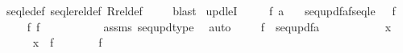 \begin{isabellebody}
\ seqle{\isacharunderscore}{\kern0pt}def\ seqlerel{\isacharunderscore}{\kern0pt}def\ Rrel{\isacharunderscore}{\kern0pt}def\ \isanewline
\ \ \isamarkupfalse%
\ blast%
\endisatagproof
{\isafoldproof}%
%
\isadelimproof
\isanewline
%
\endisadelimproof
\isanewline
{}\isamarkupfalse%
\ upd{\isacharunderscore}{\kern0pt}leI\ {\isacharcolon}{\kern0pt}\ \isanewline
\ \ \ {\isachardoublequoteopen}f{\isasymin}{}{\isacharcircum}{\kern0pt}{\isacharless}{\kern0pt}{\isasymomega}{\isachardoublequoteclose}\ {\isachardoublequoteopen}a{\isasymin}{}{\isachardoublequoteclose}\isanewline
\ \ \ {\isachardoublequoteopen}{\isasymlangle}seq{\isacharunderscore}{\kern0pt}upd{\isacharparenleft}{\kern0pt}f{\isacharcomma}{\kern0pt}a{\isacharparenright}{\kern0pt}{\isacharcomma}{\kern0pt}f{\isasymrangle}{\isasymin}seqle{\isachardoublequoteclose}\ \ {\isacharparenleft}{\kern0pt}\ {\isachardoublequoteopen}{\isasymlangle}{\isacharquery}{\kern0pt}f{\isacharcomma}{\kern0pt}{\isacharunderscore}{\kern0pt}{\isasymrangle}{\isasymin}{\isacharunderscore}{\kern0pt}{\isachardoublequoteclose}{\isacharparenright}{\kern0pt}\isanewline
%
\isadelimproof
%
\endisadelimproof
%
\isatagproof
{}\isamarkupfalse%
\isanewline
\ \ \isamarkupfalse%
\ {\isachardoublequoteopen}\ {\isasymlangle}{\isacharquery}{\kern0pt}f{\isacharcomma}{\kern0pt}\ f{\isasymrangle}\ {\isasymin}\ {}{\isacharcircum}{\kern0pt}{\isacharless}{\kern0pt}{\isasymomega}\ {\isasymtimes}\ {}{\isacharcircum}{\kern0pt}{\isacharless}{\kern0pt}{\isasymomega}{\isachardoublequoteclose}\ \isanewline
\ \ \ \ \isamarkupfalse%
\ assms\ seq{\isacharunderscore}{\kern0pt}upd{\isacharunderscore}{\kern0pt}type\ \isamarkupfalse%
\ auto\isanewline
{}\isamarkupfalse%
\isanewline
\ \ \isamarkupfalse%
\ \ {\isachardoublequoteopen}f\ {\isasymsubseteq}\ seq{\isacharunderscore}{\kern0pt}upd{\isacharparenleft}{\kern0pt}f{\isacharcomma}{\kern0pt}a{\isacharparenright}{\kern0pt}{\isachardoublequoteclose}\ \isanewline
\ \ \isamarkupfalse%
\ \isanewline
\ \ \ \ \isamarkupfalse%
\ x\isanewline
\ \ \ \ \isamarkupfalse%
\ {\isachardoublequoteopen}x\ {\isasymin}\ f{\isachardoublequoteclose}\isanewline
\ \ \ \ \isamarkupfalse%
\ \isamarkupfalse%
\ {\isacartoucheopen}f\ {\isasymin}\ {}{\isacharcircum}{\kern0pt}{\isacharless}{\kern0pt}{\isasymomega}{\isacartoucheclose}\isanewline

\end{isabellebody}

